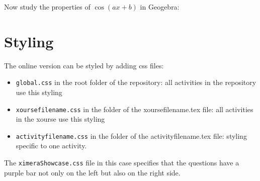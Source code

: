 \documentclass{ximera}
\begin{document}
Now study the properties of $\cos(ax+b)$ in Geogebra:


\begin{center}
\end{center}



\begin{comment}
\subsubsection{Do you know Sage?}

In Sage, you can relatively easily study the parametric equations of a circle:

\begin{sageCell}
    var('s t')
    x(t) = 3*cos(t)
    y(t) = 3*sin(t)
    c(t) = (x(t),y(t))
    circle=parametric_plot(c(t),(t,0,2*pi),color="black")
    circle
\end{sageCell}

\pdfOnly{In the online version you can experiment with this code. 

    See [some complicated url] or [a qrcode]
}

\begin{onlineOnly}

    Modify the code and press Evaluate!

    Nice, as they say ...

\begin{sageOutput}
    var('s t')
    x(t) = 3*cos(t)
    y(t) = 3*sin(t)
    c(t) = (x(t),y(t))
    circle=parametric_plot(c(t),(t,0,2*pi),color="black")
    circle
\end{sageOutput}
\end{onlineOnly}
\end{comment}

\section{Styling}
	The online version can be styled by adding css files:
	\begin{itemize}
		\item \verb|global.css| in the root folder of the repository: all activities in the repository use this styling
		\item \verb|xoursefilename.css| in the folder of the xoursefilename.tex file: all activities in the xourse use this styling
		\item \verb|activityfilename.css| in the folder of the activityfilename.tex file: styling specific to one activity.
	\end{itemize}
	The \verb|ximeraShowcase.css| file in this case specifies that the questions have a purple bar not only on the left but also on the right side.
\end{document}
